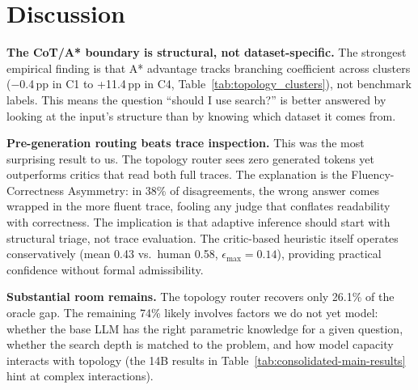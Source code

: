 \documentclass[10pt]{article}
\begin{document}
\section{Discussion}
\label{sec:discussion}


\textbf{The CoT/A* boundary is structural, not dataset-specific.}
The strongest empirical finding is that A* advantage tracks branching coefficient across clusters ($-$0.4\,pp in C1 to +11.4\,pp in C4, Table~\ref{tab:topology_clusters}), not benchmark labels. This means the question ``should I use search?'' is better answered by looking at the input's structure than by knowing which dataset it comes from.

\textbf{Pre-generation routing beats trace inspection.}
This was the most surprising result to us. The topology router sees zero generated tokens yet outperforms critics that read both full traces. The explanation is the Fluency-Correctness Asymmetry: in 38\% of disagreements, the wrong answer comes wrapped in the more fluent trace, fooling any judge that conflates readability with correctness. The implication is that adaptive inference should start with structural triage, not trace evaluation. The critic-based heuristic itself operates conservatively (mean 0.43 vs.\ human 0.58, $\epsilon_{\max}=0.14$), providing practical confidence without formal admissibility.

\textbf{Substantial room remains.}
The topology router recovers only 26.1\% of the oracle gap. The remaining 74\% likely involves factors we do not yet model: whether the base LLM has the right parametric knowledge for a given question, whether the search depth is matched to the problem, and how model capacity interacts with topology (the 14B results in Table~\ref{tab:consolidated-main-results} hint at complex interactions).
\end{document}
